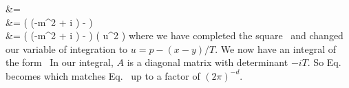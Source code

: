 {{		&= \intoi \ddT \intnii \dddp \exp{} \notag \\
		&= \intoi \ddT \exp(  (-m^2 + i \eps) -  ) \intnii \dddp {} \notag \\
		&= \intoi \ddT \exp(  (-m^2 + i \eps) -  ) \intnii \dddu \exp(  u^2 ) \label{thing1a3}
	}
	where we have completed the square~\cite[p.~282]{Peskin} and changed our variable of integration to $u = p - (x - y) / T$.  We now have an integral of the form~\cite{QFT}
	In our integral, $A$ is a diagonal matrix with determinant $-i T$.  So Eq.~ becomes
	which matches Eq.~ up to a factor of $(2\pi)^{-d}$.
}


\clearpage
{}

